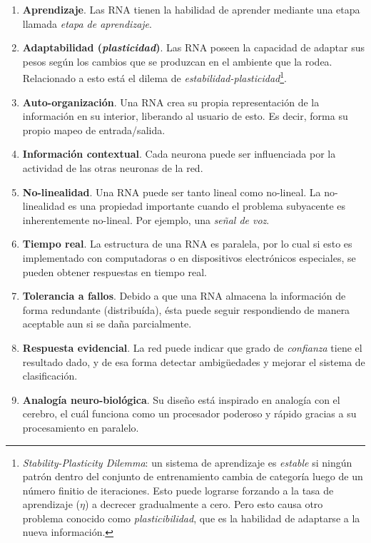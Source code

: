 \documentclass[10pt,a4paper]{article}
\begin{document}
\begin{enumerate}
\item \textbf{Aprendizaje}. Las RNA tienen la habilidad de aprender mediante una etapa llamada \textit{etapa de aprendizaje}.
\item \textbf{Adaptabilidad (\textit{plasticidad})}. Las RNA poseen la capacidad de adaptar sus pesos según los cambios que se produzcan en el ambiente que la rodea. Relacionado a esto está el dilema de \textit{estabilidad-plasticidad}\footnote{\textit{Stability-Plasticity Dilemma}: un sistema de aprendizaje es \textit{estable} si ningún patrón dentro del conjunto de entrenamiento cambia de categoría luego de un número finitio de iteraciones. Esto puede lograrse forzando a la tasa de aprendizaje ($\eta$) a decrecer gradualmente a cero. Pero esto causa otro problema conocido como \textit{plasticibilidad}, que es la habilidad de adaptarse a la nueva información.}.
\item \textbf{Auto-organización}. Una RNA crea su propia representación de la información en su interior, liberando al usuario de esto. Es decir, forma su propio mapeo de entrada/salida.
\item \textbf{Información contextual}. Cada neurona puede ser influenciada por la actividad de las otras neuronas de la red.
\item \textbf{No-linealidad}. Una RNA puede ser tanto lineal como no-lineal. La no-linealidad es una propiedad importante cuando el problema subyacente es inherentemente no-lineal. Por ejemplo, una \textit{señal de voz}.
\item \textbf{Tiempo real}. La estructura de una RNA es paralela, por lo cual si esto es implementado con computadoras o en dispositivos electrónicos especiales, se pueden obtener respuestas en tiempo real.
\item \textbf{Tolerancia a fallos}. Debido a que una RNA almacena la información de forma redundante (distribuída), ésta puede seguir respondiendo de manera aceptable aun si se daña parcialmente.
\item \textbf{Respuesta evidencial}. La red puede indicar que grado de \textit{confianza} tiene el resultado dado, y de esa forma detectar ambigüedades y mejorar el sistema de clasificación.
\item \textbf{Analogía neuro-biológica}. Su diseño está inspirado en analogía con el cerebro, el cuál funciona como un procesador poderoso y rápido gracias a su procesamiento en paralelo.
\end{enumerate}
\end{document}
